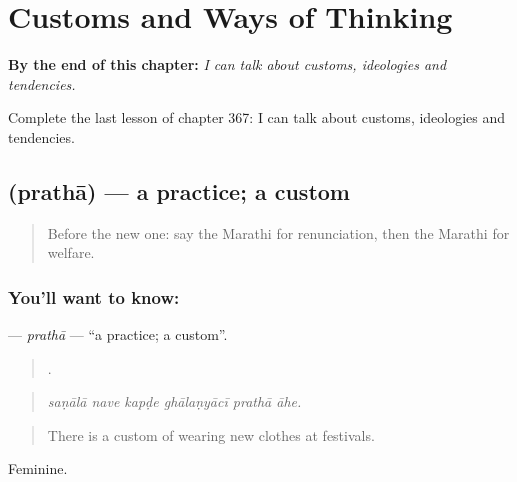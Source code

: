 
\chapter{Customs and Ways of Thinking}
\label{ch:mr-customs-and-ways-of-thinking}

\begin{chapteropening}
\textbf{By the end of this chapter:} \emph{I can talk about customs, ideologies and tendencies.}

Complete the last lesson of chapter 367: I can talk about customs, ideologies and tendencies.
\end{chapteropening}

\section[\texorpdfstring{\mr{प्रथा} (prathā)}{प्रथा (prathā)}]{ (prathā) — a practice; a custom}

\label{lesson:MR-C367-pratha}



\begin{quote}
Before the new one: say the Marathi for renunciation, then the Marathi for welfare.
\end{quote}

\subsection*{You'll want to know: }
\textbf{} — \emph{prathā} — \textquotedblleft{}a practice; a custom\textquotedblright{}.

\begin{quote}
     .
\end{quote}

\begin{quote}
\emph{saṇālā nave kapḍe ghālaṇyācī prathā āhe.}
\end{quote}

\begin{quote}
There is a custom of wearing new clothes at festivals.
\end{quote}

Feminine.

